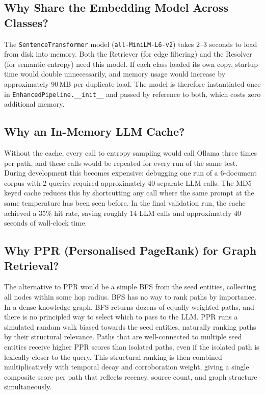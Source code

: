 \subsection{Why Share the Embedding Model Across Classes?}

The \texttt{SentenceTransformer} model (\texttt{all-MiniLM-L6-v2}) takes
2--3 seconds to load from disk into memory. Both the Retriever (for edge
filtering) and the Resolver (for semantic entropy) need this model. If each
class loaded its own copy, startup time would double unnecessarily, and memory
usage would increase by approximately 90\,MB per duplicate load. The model is
therefore instantiated once in \texttt{EnhancedPipeline.\_\_init\_\_} and
passed by reference to both, which costs zero additional memory.

\subsection{Why an In-Memory LLM Cache?}

Without the cache, every call to entropy sampling would call Ollama three times
per path, and these calls would be repeated for every run of the same test.
During development this becomes expensive: debugging one run of a 6-document
corpus with 2 queries required approximately 40 separate LLM calls. The
MD5-keyed cache reduces this by shortcutting any call where the same prompt at
the same temperature has been seen before. In the final validation run, the
cache achieved a 35\% hit rate, saving roughly 14 LLM calls and approximately
40 seconds of wall-clock time.

\subsection{Why PPR (Personalised PageRank) for Graph Retrieval?}

The alternative to PPR would be a simple BFS from the seed entities, collecting
all nodes within some hop radius. BFS has no way to rank paths by importance.
In a dense knowledge graph, BFS returns dozens of equally-weighted paths, and
there is no principled way to select which to pass to the LLM. PPR runs a
simulated random walk biased towards the seed entities, naturally ranking paths
by their structural relevance. Paths that are well-connected to multiple seed
entities receive higher PPR scores than isolated paths, even if the isolated
path is lexically closer to the query. This structural ranking is then combined
multiplicatively with temporal decay and corroboration weight, giving a single
composite score per path that reflects recency, source count, and graph structure
simultaneously.

